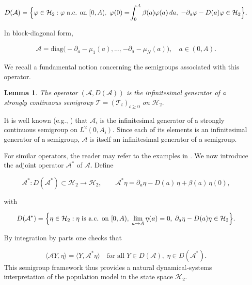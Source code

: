 \documentclass[10pt, a4paper]{amsart}
\makeatletter
\theoremstyle{plain}
\newtheorem{lemma}{Lemma}[section]
\theoremstyle{definition}
\theoremstyle{remark}
\renewenvironment{proof}[1][\proofname]{\par
  \pushQED{\qed}%
  \normalfont \topsep6\p@\@plus6\p@\relax
  \trivlist
  \item[\hskip\labelsep
        \itshape
    #1\ \ref{#1}.]\ignorespaces
}{%
  \popQED\endtrivlist\@endpefalse
}
\numberwithin{equation}{section}
\def\to{\rightarrow}
\makeatother
\begin{document}
\begin{align}
D(\mathcal A)
   = \Bigl\{\varphi\in\mathcal H_2 :
     \varphi\text{ a.c. on }[0,A),\;
    \varphi(0)=\!\int_0^A\beta(a)\varphi(a)\,da,\;
     -\partial_a\varphi - D(a)\varphi\in\mathcal H_2
   \Bigr\}.
\end{align}

In block‑diagonal form,

\begin{align}
 \mathcal A
   = \mathrm{diag}\bigl(-\partial_a-\mu_1(a),\dots,-\partial_a-\mu_N(a)\bigr),
   \quad a\in(0,A).
\end{align}

We recall a fundamental notion concerning the semigroups associated with this operator.
\begin{lemma}\label{le2.1}
The operator $(\mathcal{A}, D(\mathcal{A}))$ is the infinitesimal generator of a strongly continuous semigroup $\mathcal{T}= (\mathcal{T}_t)_{t\geq 0}$ on $\mathcal{H}_2.$
\end{lemma}
\begin{proof}[of Lemma \ref{le2.1}]
It is well known (e.g., \cite{ref60, ref59}) that $\mathcal{A}_i$ is the infinitesimal generator of a strongly continuous semigroup on $L^2(0,A_i).$ Since each of its elements is an infinitesimal generator of a semigroup, $\mathcal{A}$ is itself an infinitesimal generator of a semigroup. 
\end{proof}

For similar operators, the reader may refer to the examples in \cite{ref28, ref48}. We now introduce the adjoint operator $\mathcal A^*$ of $\mathcal A$.  Define

$$
   \mathcal A^*: D(\mathcal A^*)\subset\mathcal H_2\longrightarrow\mathcal H_2,
   \qquad
   \mathcal A^*\eta = \partial_a\eta - D(a)\,\eta + \beta(a)\,\eta(0),
 $$

 with

$$
   D(\mathcal A^*) = \Bigl\{\eta\in\mathcal H_2 : 
     \eta\text{ is a.c. on }[0,A),\;
     \lim_{a\to A}\eta(a)=0,\;
     \partial_a\eta - D(a)\eta\in\mathcal H_2
   \Bigr\}.
 $$

By integration by parts one checks that

$$
   \langle \mathcal A Y,\eta\rangle 
   = \langle Y,\mathcal A^*\eta\rangle
   \quad\text{for all }Y\in D(\mathcal A),\;\eta\in D(\mathcal A^*).
$$
This semigroup framework thus provides a natural dynamical‐systems interpretation of the population model in the state space $\mathcal H_2$.
\end{document}
